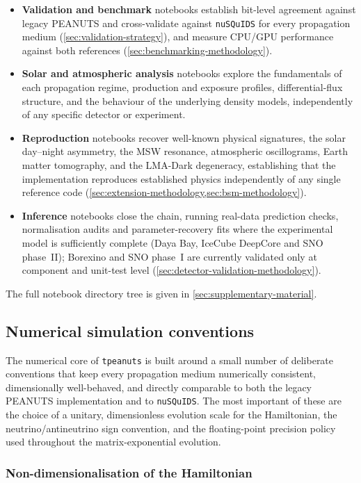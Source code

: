 \begin{itemize}
  \item \textbf{Validation and benchmark} notebooks establish bit-level agreement against legacy PEANUTS and cross-validate against \texttt{nuSQuIDS} for every propagation medium (\cref{sec:validation-strategy}), and measure CPU/GPU performance against both references (\cref{sec:benchmarking-methodology}).
  \item \textbf{Solar and atmospheric analysis} notebooks explore the fundamentals of each propagation regime, production and exposure profiles, differential-flux structure, and the behaviour of the underlying density models, independently of any specific detector or experiment.
  \item \textbf{Reproduction} notebooks recover well-known physical signatures, the solar day--night asymmetry, the MSW resonance, atmospheric oscillograms, Earth matter tomography, and the LMA-Dark degeneracy, establishing that the implementation reproduces established physics independently of any single reference code (\cref{sec:extension-methodology,sec:bsm-methodology}).
  \item \textbf{Inference} notebooks close the chain, running real-data prediction checks, normalisation audits and parameter-recovery fits where the experimental model is sufficiently complete (Daya Bay, IceCube DeepCore and SNO phase~II); Borexino and SNO phase~I are currently validated only at component and unit-test level (\cref{sec:detector-validation-methodology}).
\end{itemize}

The full notebook directory tree is given in \cref{sec:supplementary-material}.

\subsection{Numerical simulation conventions}

The numerical core of \texttt{tpeanuts} is built around a small number of deliberate conventions that keep every propagation medium numerically consistent, dimensionally well-behaved, and directly comparable to both the legacy PEANUTS implementation and to \texttt{nuSQuIDS}. The most important of these are the choice of a unitary, dimensionless evolution scale for the Hamiltonian, the neutrino/antineutrino sign convention, and the floating-point precision policy used throughout the matrix-exponential evolution.

\subsubsection{Non-dimensionalisation of the Hamiltonian}

